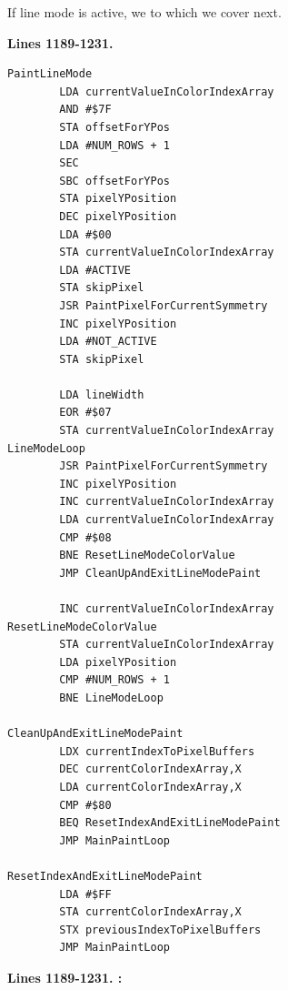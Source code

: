 If line mode is active, we  to  which we cover next.

\clearpage
\textbf{Lines 1189-1231. } 
\begin{lstlisting}[caption=From \icode{PaintLineMode}.]
PaintLineMode 
        LDA currentValueInColorIndexArray
        AND #$7F
        STA offsetForYPos
        LDA #NUM_ROWS + 1
        SEC 
        SBC offsetForYPos
        STA pixelYPosition
        DEC pixelYPosition
        LDA #$00
        STA currentValueInColorIndexArray
        LDA #ACTIVE
        STA skipPixel
        JSR PaintPixelForCurrentSymmetry
        INC pixelYPosition
        LDA #NOT_ACTIVE
        STA skipPixel

        LDA lineWidth
        EOR #$07
        STA currentValueInColorIndexArray
LineModeLoop   
        JSR PaintPixelForCurrentSymmetry
        INC pixelYPosition
        INC currentValueInColorIndexArray
        LDA currentValueInColorIndexArray
        CMP #$08
        BNE ResetLineModeColorValue
        JMP CleanUpAndExitLineModePaint

        INC currentValueInColorIndexArray
ResetLineModeColorValue   
        STA currentValueInColorIndexArray
        LDA pixelYPosition
        CMP #NUM_ROWS + 1
        BNE LineModeLoop

CleanUpAndExitLineModePaint    
        LDX currentIndexToPixelBuffers
        DEC currentColorIndexArray,X
        LDA currentColorIndexArray,X
        CMP #$80
        BEQ ResetIndexAndExitLineModePaint
        JMP MainPaintLoop

ResetIndexAndExitLineModePaint   
        LDA #$FF
        STA currentColorIndexArray,X
        STX previousIndexToPixelBuffers
        JMP MainPaintLoop
\end{lstlisting}
\clearpage

\textbf{Lines 1189-1231. :} 
\clearpage

